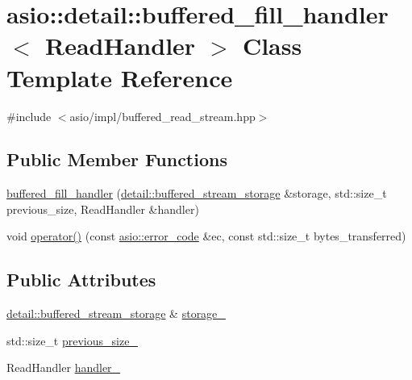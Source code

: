 \hypertarget{classasio_1_1detail_1_1buffered__fill__handler}{}\section{asio\+:\+:detail\+:\+:buffered\+\_\+fill\+\_\+handler$<$ Read\+Handler $>$ Class Template Reference}
\label{classasio_1_1detail_1_1buffered__fill__handler}


{\ttfamily \#include $<$asio/impl/buffered\+\_\+read\+\_\+stream.\+hpp$>$}

\subsection*{Public Member Functions}
\begin{DoxyCompactItemize}
\item 
\hyperlink{classasio_1_1detail_1_1buffered__fill__handler_a8b7c319d78e941cf98cd53fd6b80b71b}{buffered\+\_\+fill\+\_\+handler} (\hyperlink{classasio_1_1detail_1_1buffered__stream__storage}{detail\+::buffered\+\_\+stream\+\_\+storage} \&storage, std\+::size\+\_\+t previous\+\_\+size, Read\+Handler \&handler)
\item 
void \hyperlink{classasio_1_1detail_1_1buffered__fill__handler_ac314c528b751b53fed6d485532d28019}{operator()} (const \hyperlink{classasio_1_1error__code}{asio\+::error\+\_\+code} \&ec, const std\+::size\+\_\+t bytes\+\_\+transferred)
\end{DoxyCompactItemize}
\subsection*{Public Attributes}
\begin{DoxyCompactItemize}
\item 
\hyperlink{classasio_1_1detail_1_1buffered__stream__storage}{detail\+::buffered\+\_\+stream\+\_\+storage} \& \hyperlink{classasio_1_1detail_1_1buffered__fill__handler_a72f7cbdd99e8f826677509495865484f}{storage\+\_\+}
\item 
std\+::size\+\_\+t \hyperlink{classasio_1_1detail_1_1buffered__fill__handler_aa02fc3d81409dab3abca8936143d61d9}{previous\+\_\+size\+\_\+}
\item 
Read\+Handler \hyperlink{classasio_1_1detail_1_1buffered__fill__handler_a539a4807928b17449322328e0c43c7a9}{handler\+\_\+}
\end{DoxyCompactItemize}


